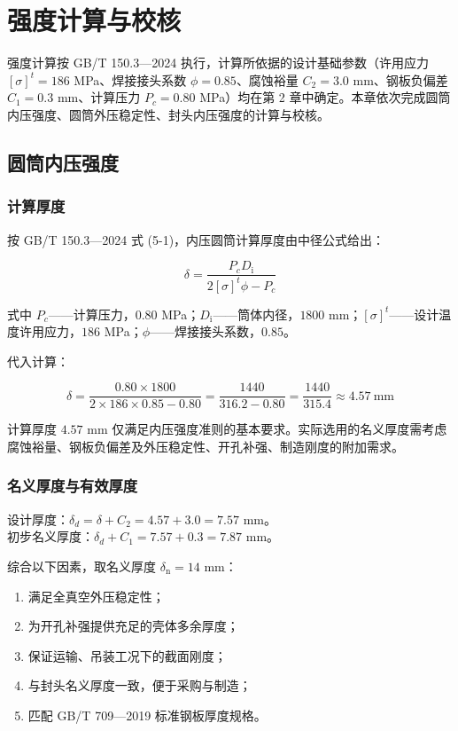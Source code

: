 
\chapter{强度计算与校核}

\label{chap:strength}

强度计算按 GB/T 150.3—2024\cite{gbt150-2024} 执行，计算所依据的设计基础参数（许用应力 $[\sigma]^t = 186$ MPa、焊接接头系数 $\phi = 0.85$、腐蚀裕量 $C_2 = 3.0$ mm、钢板负偏差 $C_1 = 0.3$ mm、计算压力 $P_c = 0.80$ MPa）均在第 2 章中确定。本章依次完成圆筒内压强度、圆筒外压稳定性、封头内压强度的计算与校核。

\section{圆筒内压强度}

\subsection{计算厚度}

按 GB/T 150.3—2024 式 (5-1)，内压圆筒计算厚度由中径公式给出：

$$ \delta = \frac{P_c D_{\mathrm{i}}}{2[\sigma]^t \phi - P_c} $$


式中 $P_c$——计算压力，$0.80$ MPa；$D_{\mathrm{i}}$——筒体内径，$1800$ mm；$[\sigma]^t$——设计温度许用应力，$186$ MPa；$\phi$——焊接接头系数，$0.85$。

代入计算：

$$
\delta = \frac{0.80 \times 1800}{2 \times 186 \times 0.85 - 0.80}
       = \frac{1440}{316.2 - 0.80}
       = \frac{1440}{315.4}
       \approx 4.57\ \text{mm}
$$

计算厚度 $4.57$ mm 仅满足内压强度准则的基本要求。实际选用的名义厚度需考虑腐蚀裕量、钢板负偏差及外压稳定性、开孔补强、制造刚度的附加需求。

\subsection{名义厚度与有效厚度}

设计厚度：$\delta_d = \delta + C_2 = 4.57 + 3.0 = 7.57$ mm。\\
初步名义厚度：$\delta_d + C_1 = 7.57 + 0.3 = 7.87$ mm。

综合以下因素，取名义厚度 $\delta_{\mathrm{n}} = 14$ mm：
\begin{enumerate}
    \item 满足全真空外压稳定性；
    \item 为开孔补强提供充足的壳体多余厚度；
    \item 保证运输、吊装工况下的截面刚度；
    \item 与封头名义厚度一致，便于采购与制造；
    \item 匹配 GB/T 709—2019 标准钢板厚度规格\cite{gbt709-2019}。
\end{enumerate}

